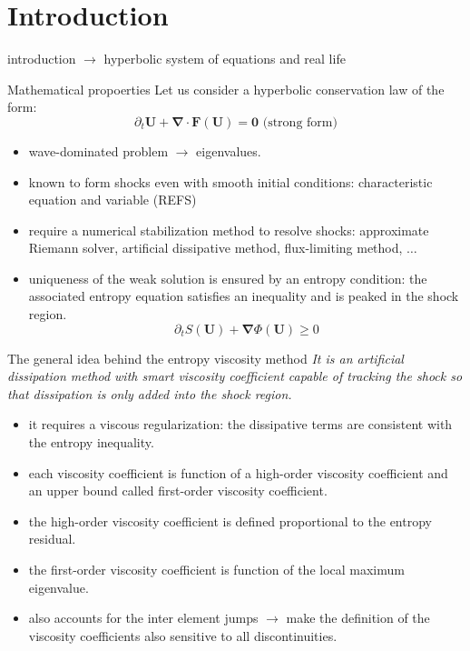 \documentclass[xcolor=dvipsnames,10pt]{beamer}
\renewcommand{\div}{\boldsymbol{\nabla}\! \cdot \!}
\newcommand{\grad}{\boldsymbol{\nabla}}
\newcommand{\mbold}[1]{\boldsymbol#1}
\begin{document}
\section{Introduction}
\begin{frame}
introduction $\to$ hyperbolic system of equations and real life
\end{frame}
\begin{frame}{Mathematical propoerties}
Let us consider a hyperbolic conservation law of the form:
\begin{equation} \partial_t \mbold U + \div \mbold F \left( \mbold U \right) = \mbold 0  \nonumber \text{ (strong form)}\end{equation} 
\begin{itemize}
\item wave-dominated problem $\to$ eigenvalues.
\item known to form shocks even with smooth initial conditions: characteristic equation and variable (REFS)
\item require a numerical stabilization method to resolve shocks: approximate Riemann solver, artificial dissipative method, flux-limiting method, $\dots$
\item uniqueness of the weak solution is ensured by an entropy condition: the associated entropy equation satisfies an inequality and is peaked in the shock region.
\begin{equation}
\partial_t S\left( \mbold U\right) + \grad \Phi \left( \mbold U \right) \geq 0  \nonumber
\end{equation}
\end{itemize}
\end{frame}
\begin{frame}{The general idea behind the entropy viscosity method}
\emph{It is an artificial dissipation method with smart viscosity coefficient capable of tracking the shock so that dissipation is only added into the shock region.}
\begin{block}{}
\begin{itemize}
\setlength{\itemsep}{10pt}
\item it requires a viscous regularization: the dissipative terms are consistent with the entropy inequality.
\item each viscosity coefficient is function of a high-order viscosity coefficient and an upper bound called first-order viscosity coefficient.
\item the high-order viscosity coefficient is defined proportional to the entropy residual.
\item the first-order viscosity coefficient is function of the local maximum eigenvalue.
\item also accounts for the inter element jumps $\to$ make the definition of the viscosity coefficients also sensitive to all discontinuities. 
\end{itemize}
\end{block}
\end{frame}
\end{document}
